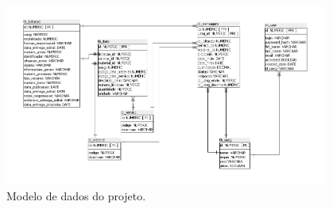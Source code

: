 \begin{figure}
	\includegraphics[width=0.95\textwidth]{figuras/bdAtualizado.png}
	\caption{Modelo de dados do projeto.}
	\label{Figura007}
\end{figure}

